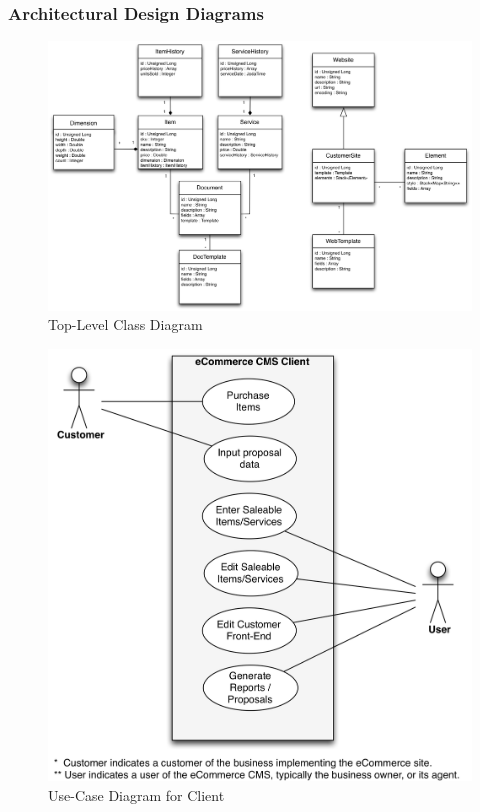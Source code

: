 \documentclass{article}
\begin{document}
\subsubsection{Architectural Design Diagrams}
\label{add}

\begin{figure}[H]
\centering
\includegraphics[width=6.5in]{../../UML/eccms-DomainObject Class Diagram.png}
\caption{Top-Level Class Diagram}
\label{server-class}
\end{figure}

\begin{figure}[H]
\centering
\includegraphics[width=4.5in]{../../UML/eccms-Use Case (Client) Diagram.png}
\caption{Use-Case Diagram for Client}
\label{client-usecase}
\end{figure}
\end{document}

